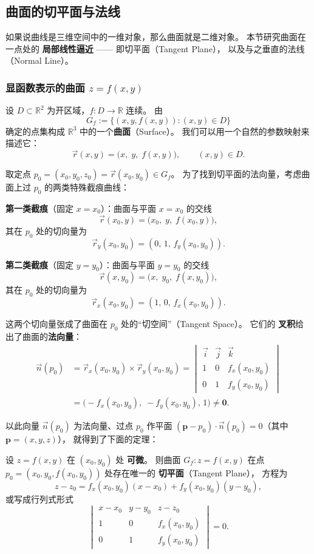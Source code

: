 \documentclass[lang=cn,11pt]{elegantbook}
\begin{document}
\subsection{曲面的切平面与法线}

如果说曲线是三维空间中的一维对象，那么曲面就是二维对象。
本节研究曲面在一点处的 \textbf{局部线性逼近} —— 即切平面（Tangent Plane），
以及与之垂直的法线（Normal Line）。

\subsubsection*{显函数表示的曲面 $z=f(x,y)$}

设 $D\subset\mathbb R^2$ 为开区域，$f:D\to\mathbb R$ 连续。
由
\[
G_f:=\{(x,y,f(x,y)):(x,y)\in D\}
\]
确定的点集构成 $\mathbb R^3$ 中的一个\textbf{曲面}（Surface）。
我们可以用一个自然的参数映射来描述它：
\[
\vec{r}(x,y)=\bigl(x,\;y,\;f(x,y)\bigr),\qquad (x,y)\in D.
\]

取定点 $p_0=(x_0,y_0,z_0)=\vec{r}(x_0,y_0)\in G_f$。
为了找到切平面的法向量，考虑曲面上过 $p_0$ 的两类特殊截痕曲线：

\textbf{第一类截痕}（固定 $x=x_0$）：曲面与平面 $x=x_0$ 的交线
\[
\vec{r}(x_0,y)=\bigl(x_0,\;y,\;f(x_0,y)\bigr),
\]
其在 $p_0$ 处的切向量为
\[
\vec{r}_y(x_0,y_0)=(0,\,1,\,f_y(x_0,y_0)).
\]

\textbf{第二类截痕}（固定 $y=y_0$）：曲面与平面 $y=y_0$ 的交线
\[
\vec{r}(x,y_0)=\bigl(x,\;y_0,\;f(x,y_0)\bigr),
\]
其在 $p_0$ 处的切向量为
\[
\vec{r}_x(x_0,y_0)=(1,\,0,\,f_x(x_0,y_0)).
\]

这两个切向量张成了曲面在 $p_0$ 处的“切空间”（Tangent Space）。
它们的 \textbf{叉积}给出了曲面的\textbf{法向量}：
\begin{align*}
\vec{n}(p_0)&=\vec{r}_x(x_0,y_0)\times\vec{r}_y(x_0,y_0)
=\begin{vmatrix}
\vec{i} & \vec{j} & \vec{k}\\
1 & 0 & f_x(x_0,y_0)\\
0 & 1 & f_y(x_0,y_0)
\end{vmatrix}\\[10pt]
&=\bigl(-f_x(x_0,y_0),\;-f_y(x_0,y_0),\,1\bigr) \neq \boldsymbol{0}.
\end{align*}

以此向量 $\vec{n}(p_0)$ 为法向量、过点 $p_0$ 作平面
$(\boldsymbol{p}-p_0)\cdot\vec{n}(p_0)=0$（其中 $\boldsymbol{p}=(x,y,z)$），
就得到了下面的定理：

\begin{theorem}[显式曲面的切平面方程] \label{thm:tangent-plane-explicit}
设 $z=f(x,y)$ 在 $(x_0,y_0)$ 处 \textbf{可微}。
则曲面 $G_f:z=f(x,y)$ 在点
$p_0=(x_0,y_0,f(x_0,y_0))$ 处存在唯一的 \textbf{切平面}（Tangent Plane），
方程为
\[
\boxed{
z-z_0=f_x(x_0,y_0)(x-x_0)+f_y(x_0,y_0)(y-y_0)},
\]
或写成行列式形式
\[
\begin{vmatrix}
x-x_0 & y-y_0 & z-z_0\\
1 & 0 & f_x(x_0,y_0)\\
0 & 1 & f_y(x_0,y_0)
\end{vmatrix}=0.
\]
\end{theorem}
\end{document}
